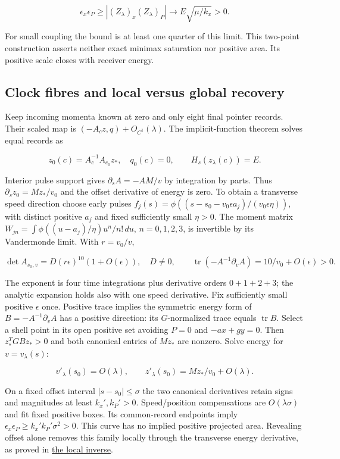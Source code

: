 \documentclass[11pt,a4paper]{article}
\begin{document}
\[\epsilon_x\epsilon_P\ge|(Z_\lambda)_x(Z_\lambda)_P|
 \longrightarrow E\sqrt{\mu/k_x}>0.\]

For small coupling the bound is at least one quarter of this limit. This
two-point construction asserts neither exact minimax saturation nor
positive area. Its positive scale closes with receiver energy.

\hypertarget{clock-fibres-and-local-versus-global-recovery}{%
\subsection{Clock fibres and local versus global
recovery}\label{clock-fibres-and-local-versus-global-recovery}}

Keep incoming momenta known at zero and only eight final pointer
records. Their scaled map is \((-A_cz,q)+O_{C^1}(\lambda)\). The
implicit-function theorem solves equal records as

\[z_0(c)=A_c^{-1}A_{c_0}z_*,\quad q_0(c)=0,\qquad
H_s(z_\lambda(c))=E.\]

Interior pulse support gives \(\partial_sA=-AM/v\) by integration by
parts. Thus \(\partial_sz_0=Mz_*/v_0\) and the offset derivative of
energy is zero. To obtain a transverse speed direction choose early
pulses \(f_j(s)=\phi((s-s_0-v_0\epsilon a_j)/(v_0\epsilon\eta))\), with
distinct positive \(a_j\) and fixed sufficiently small \(\eta>0\). The
moment matrix \(W_{jn}=\int\phi((u-a_j)/\eta)u^n/n!\,du\),
\(n=0,1,2,3\), is invertible by its Vandermonde limit. With \(r=v_0/v\),

\[\det A_{s_0,v}=D(r\epsilon)^{10}(1+O(\epsilon)),\quad D\ne0,
\qquad\operatorname{tr}(-A^{-1}\partial_vA)=10/v_0+O(\epsilon)>0.\]

The exponent is four time integrations plus derivative orders
\(0+1+2+3\); the analytic expansion holds also with one speed
derivative. Fix sufficiently small positive \(\epsilon\) once. Positive
trace implies the symmetric energy form of \(B=-A^{-1}\partial_vA\) has
a positive direction: its \(G\)-normalized trace equals
\(\operatorname{tr}B\). Select a shell point in its open positive set
avoiding \(P=0\) and \(-ax+gy=0\). Then \(z_*^TGBz_*>0\) and both
canonical entries of \(Mz_*\) are nonzero. Solve energy for
\(v=v_\lambda(s)\):

\[v'_\lambda(s_0)=O(\lambda),\qquad
z'_\lambda(s_0)=Mz_*/v_0+O(\lambda).\]

On a fixed offset interval \(|s-s_0|\le\sigma\) the two canonical
derivatives retain signs and magnitudes at least \(k_x',k_P'>0\).
Speed/position compensations are \(O(\lambda\sigma)\) and fit fixed
positive boxes. Its common-record endpoints imply
\(\epsilon_x\epsilon_P\ge k_x'k_P'\sigma^2>0\). This curve has no
implied positive projected area. Revealing offset alone removes this
family locally through the transverse energy derivative, as proved in
\href{autonomous-finite-readout.md\#energy-assisted-local-recovery-and-its-global-obstruction}{the
local inverse}.
\end{document}
